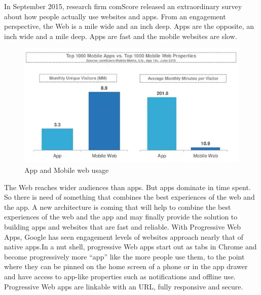 \documentclass[14pt,a4paper,final]{extreport}
\begin{document}
\item In September 2015, research firm comScore released an extraordinary survey about how people actually use websites and apps. From an engagement perspective, the Web is a mile wide and an inch deep. Apps are the opposite, an inch wide and a mile deep. Apps are fast and the mobile websites are slow.
\newline
\newline
\begin{figure}[h]
	\begin{center}
		\includegraphics[scale=.7]{im1.png}
		\vspace{.1 cm}
    \caption{App and Mobile web usage}
	\end{center}
\end{figure}
\item The Web reaches wider audiences than apps. But apps dominate in time spent. So there is need of something that combines the best experiences of the web and the app. A new architecture is coming that will help to combine the best experiences of the web and the app and may finally provide the solution to building apps and websites that are fast and reliable. With Progressive Web Apps, Google has seen engagement levels of websites approach nearly that of native apps.In a nut shell, progressive Web apps start out as tabs in Chrome and become progressively more “app” like the more people use them, to the point where they can be pinned on the home screen of a phone or in the app drawer and have access to app-like properties such as notifications and offline use. Progressive Web apps are linkable with an URL, fully responsive and secure.


\begin{enumerate}
\end{enumerate}
\end{document}
